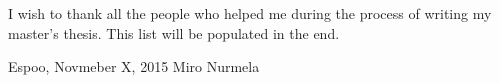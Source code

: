 \documentclass[12pt,a4paper,twoside]{report}
\newcommand{\DATE}{Novmeber X, 2015}
\newcommand{\AUTHOR}{Miro Nurmela}
\begin{document}
I wish to thank all the people who helped me during the process of writing
my master's thesis. This list will be populated in the end.

\vskip 10mm

\noindent Espoo, \DATE
\vskip 5mm
\noindent\AUTHOR

\cleardoublepage


\cleardoublepage

\tableofcontents
\label{pages-prelude}
\cleardoublepage




\startfirstchapter

\pagestyle{headings}

\startchapright
\end{document}

